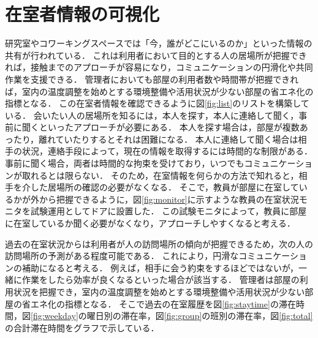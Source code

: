 \section{在室者情報の可視化}\label{3.2}
研究室やコワーキングスペースでは「今，誰がどこにいるのか」といった情報の共有が行われている．
これは利用者において目的とする人の居場所が把握できれば，接触までのアプローチが容易になり，コミュニケーションの円滑化や共同作業を支援できる．
管理者においても部屋の利用者数や時間帯が把握できれば，室内の温度調整を始めとする環境整備や活用状況が少ない部屋の省エネ化の指標となる．
この在室者情報を確認できるように図\ref{fig:list}のリストを構築している．
会いたい人の居場所を知るには，本人を探す，本人に連絡して聞く，事前に聞くといったアプローチが必要にある．
本人を探す場合は，部屋が複数あったり，離れていたりするとそれは困難になる．
本人に連絡して聞く場合は相手の状況，連絡手段によって，現在の情報を取得するには時間的な制限がある．
事前に聞く場合，両者は時間的な拘束を受けており，いつでもコミュニケーションが取れるとは限らない．
そのため，在室情報を何らかの方法で知れると，相手を介した居場所の確認の必要がなくなる．
そこで，教員が部屋に在室しているかが外から把握できるように，図\ref{fig:monitor}に示すような教員の在室状況モニタを試験運用としてドアに設置した．
この試験モニタによって，教員に部屋に在室しているか聞く必要がなくなり，アプローチしやすくなると考える．


過去の在室状況からは利用者が人の訪問場所の傾向が把握できるため，次の人の訪問場所の予測がある程度可能である．
これにより，円滑なコミュニケーションの補助になると考える．
例えば，相手に会う約束をするほどではないが，一緒に作業をしたら効率が良くなるといった場合が該当する．
管理者は部屋の利用状況を把握でき，室内の温度調整を始めとする環境整備や活用状況が少ない部屋の省エネ化の指標となる．
そこで過去の在室履歴を図\ref{fig:staytime}の滞在時間，図\ref{fig:weekday}の曜日別の滞在率，図\ref{fig:group}の班別の滞在率，図\ref{fig:total}の合計滞在時間をグラフで示している．

